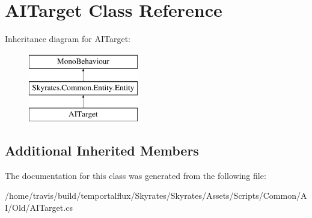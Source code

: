 \hypertarget{class_a_i_target}{\section{A\-I\-Target Class Reference}
\label{class_a_i_target}
}
Inheritance diagram for A\-I\-Target\-:\begin{figure}[H]
\begin{center}
\leavevmode
\includegraphics[height=3.000000cm]{class_a_i_target}
\end{center}
\end{figure}
\subsection*{Additional Inherited Members}


The documentation for this class was generated from the following file\-:\begin{DoxyCompactItemize}
\item 
/home/travis/build/temportalflux/\-Skyrates/\-Skyrates/\-Assets/\-Scripts/\-Common/\-A\-I/\-Old/A\-I\-Target.\-cs\end{DoxyCompactItemize}
